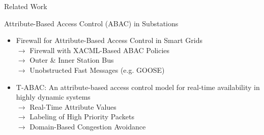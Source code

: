 \documentclass[en]{sdqbeamer}
\begin{document}
\begin{frame}{Related Work}
    \begin{blueblock}{Attribute-Based Access Control (ABAC) in Substations}
        \begin{itemize}
            \item Firewall for Attribute-Based Access Control in Smart Grids \parencite{Ruland2018}
            \\$\rightarrow$ Firewall with XACML-Based ABAC Policies
            \\$\rightarrow$ Outer \& Inner Station Bus
            \\$\rightarrow$ Unobstructed Fast Messages (e.g. GOOSE)
            \item T-ABAC: An attribute-based access control model for real-time availability in highly dynamic systems \parencite{Burmester2013}
            \\$\rightarrow$ Real-Time Attribute Values
            \\$\rightarrow$ Labeling of High Priority Packets
            \\$\rightarrow$ Domain-Based Congestion Avoidance
        \end{itemize}
    \end{blueblock}
\end{frame}
\end{document}
